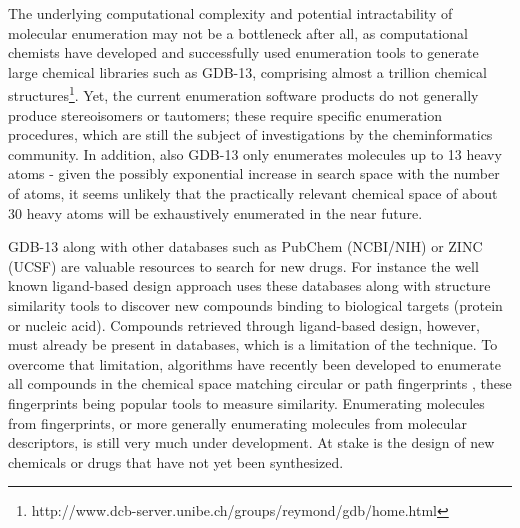 \documentclass{sig-alternate}
\begin{document}
The underlying computational complexity and potential intractability
of molecular enumeration may not be a bottleneck after all, as
computational chemists have developed and successfully used
enumeration tools to generate large chemical libraries such as GDB-13,
comprising almost a trillion chemical
structures\footnote{http://www.dcb-server.unibe.ch/groups/reymond/gdb/home.html}. Yet,
the current enumeration software products do not generally produce
stereoisomers or tautomers; these require specific enumeration
procedures, which are still the subject of investigations by the
cheminformatics community. In addition, also GDB-13 only enumerates molecules up to 13 heavy atoms - given the possibly exponential increase in search space with the number of atoms, it seems unlikely that the practically relevant chemical space of about 30 heavy atoms will be exhaustively enumerated in the near future.

GDB-13 along with other databases such as PubChem (NCBI/NIH) or ZINC
(UCSF) are valuable resources to search for new drugs. For instance
the well known ligand-based design approach uses these databases along
with structure similarity tools to discover new compounds binding to
biological targets (protein or nucleic acid). Compounds retrieved
through ligand-based design, however, must already be present in
databases, which is a limitation of the technique. To overcome that
limitation, algorithms have recently been developed to enumerate all
compounds in the chemical space matching circular \cite{faulon2003} or
path fingerprints \cite{fujiwara2008}, these fingerprints being
popular tools to measure similarity. Enumerating molecules from
fingerprints, or more generally enumerating molecules from molecular
descriptors, is still very much under development. At stake is the
design of new chemicals or drugs that have not yet been synthesized.
\end{document}
